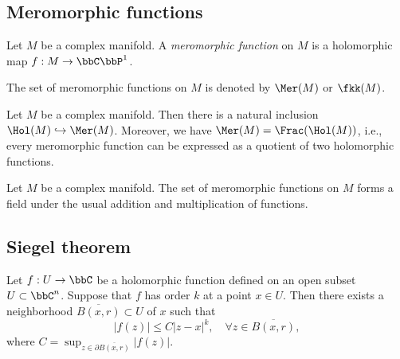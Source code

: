 \subsection{Meromorphic functions}

    \begin{definition}\label{def:meromorphic_functions}
        Let \(M\) be a complex manifold.
        A \emph{meromorphic function} on \(M\) is a holomorphic map \(f: M \to \bbC\bbP^1\).

        The set of meromorphic functions on \(M\) is denoted by \(\Mer(M)\) or \(\fkk(M)\).
    \end{definition}

    \begin{proposition}\label{prop:meromorphic_functions_and_holomorphic_functions}
        Let \(M\) be a complex manifold.
        Then there is a natural inclusion \(\Hol(M) \hookrightarrow \Mer(M)\).
        Moreover, we have \(\Mer(M) = \Frac(\Hol(M))\), i.e., every meromorphic function can be expressed as a quotient of two holomorphic functions.
    \end{proposition}

    \begin{proposition}\label{prop:meromorphic_functions_is_a_field}
        Let \(M\) be a complex manifold.
        The set of meromorphic functions on \(M\) forms a field under the usual addition and multiplication of functions.
    \end{proposition}



\subsection{Siegel theorem}

    \begin{proposition}\label{prop:schwarz_lemma_in_several_variables}
        Let \(f:U \to \bbC\) be a holomorphic function defined on an open subset \(U \subset \bbC^n\).
        Suppose that \(f\) has order \(k\) at a point \(x \in U\).
        Then there exists a neighborhood \(\overline{B(x,r)} \subset U\) of \(x\) such that
        \[
            |f(z)| \leq C |z - x|^k, \quad \forall z \in \overline{B(x,r)},
        \]
        where \(C = \sup_{z \in \partial \overline{B(x,r)}} \left| f(z) \right|\).
    \end{proposition}


